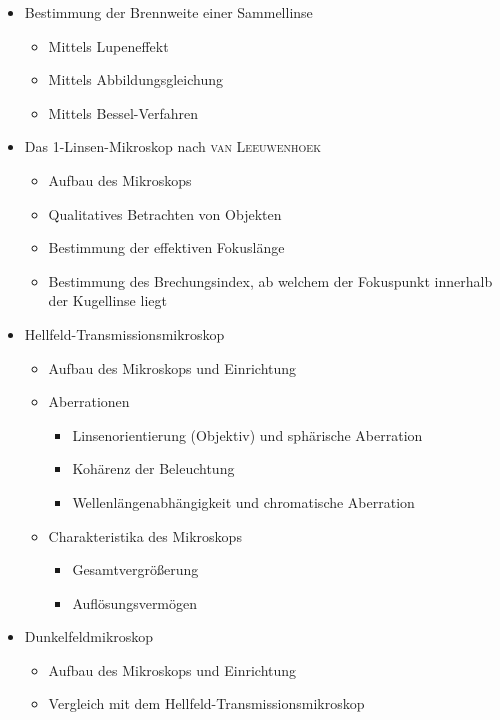 \documentclass[ngerman]{scrartcl}
\begin{document}
\begin{itemize}
    \item Bestimmung der Brennweite einer Sammellinse
          \begin{itemize}
              \item Mittels Lupeneffekt
              \item Mittels Abbildungsgleichung
              \item Mittels Bessel-Verfahren
          \end{itemize}
    \item Das 1-Linsen-Mikroskop nach \textsc{van Leeuwenhoek}
          \begin{itemize}
              \item Aufbau des Mikroskops
              \item Qualitatives Betrachten von Objekten
              \item Bestimmung der effektiven Fokuslänge
              \item Bestimmung des Brechungsindex, ab welchem der Fokuspunkt innerhalb der Kugellinse liegt
          \end{itemize}
    \item Hellfeld-Transmissionsmikroskop
          \begin{itemize}
              \item Aufbau des Mikroskops und Einrichtung
              \item Aberrationen
                    \begin{itemize}
                        \item Linsenorientierung (Objektiv) und sphärische Aberration
                        \item Kohärenz der Beleuchtung
                        \item Wellenlängenabhängigkeit und chromatische Aberration
                    \end{itemize}
              \item Charakteristika des Mikroskops
                    \begin{itemize}
                        \item Gesamtvergrößerung
                        \item Auflösungsvermögen
                    \end{itemize}
          \end{itemize}
    \item Dunkelfeldmikroskop
          \begin{itemize}
              \item Aufbau des Mikroskops und Einrichtung
              \item Vergleich mit dem Hellfeld-Transmissionsmikroskop
          \end{itemize}
\end{itemize}
\end{document}
